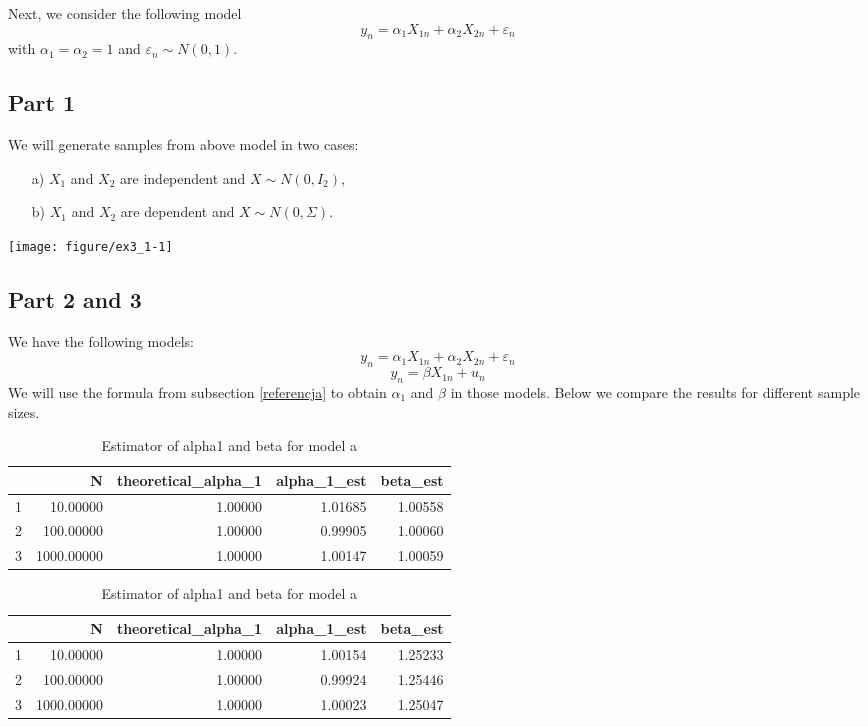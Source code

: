 \documentclass[12pt, a4paper]{article}\usepackage[]{graphicx}\usepackage[]{color}
\makeatletter
\def\maxwidth{ %
  \ifdim\Gin@nat@width>\linewidth
    \linewidth
  \else
    \Gin@nat@width
  \fi
}
\makeatother
\begin{document}
Next, we consider the following model
\[y_{n} = \alpha_{1}X_{1n}+\alpha_{2}X_{2n}+\varepsilon_{n}\]
with $\alpha_{1} = \alpha_{2} = 1$ and $\varepsilon_{n}\sim N(0,1)$.



\subsection{Part 1}
We will generate samples from above model in two cases:
\begin{enumerate}
\item[a)] $X_{1}$ and $X_{2}$ are independent and $X \sim N(0,I_{2})$,
\item[b)] $X_{1}$ and $X_{2}$ are dependent and $X \sim N(0,\Sigma)$.
\end{enumerate}


{\centering \texttt{[image: figure/ex3\_1-1]} 

}






\subsection{Part 2 and 3}
We have the following models: 
\[ y_{n} = \alpha_{1}X_{1n}+\alpha_{2}X_{2n}+\varepsilon_{n} \]
\[ y_{n} = \beta X_{1n}+u_{n} \]
We will use the formula from subsection \ref{referencja} to obtain $\alpha_{1}$ and $\beta$ in those models. 
Below we compare the results for different sample sizes.
\begin{table}[ht]
\centering
\begin{tabular}{rrrrr}
  \hline
 & N & theoretical\_alpha\_1 & alpha\_1\_est & beta\_est \\ 
  \hline
1 & 10.00000 & 1.00000 & 1.01685 & 1.00558 \\ 
  2 & 100.00000 & 1.00000 & 0.99905 & 1.00060 \\ 
  3 & 1000.00000 & 1.00000 & 1.00147 & 1.00059 \\ 
   \hline
\end{tabular}
\caption{Estimator of alpha1 and beta for model a} 
\end{table}
\begin{table}[ht]
\centering
\begin{tabular}{rrrrr}
  \hline
 & N & theoretical\_alpha\_1 & alpha\_1\_est & beta\_est \\ 
  \hline
1 & 10.00000 & 1.00000 & 1.00154 & 1.25233 \\ 
  2 & 100.00000 & 1.00000 & 0.99924 & 1.25446 \\ 
  3 & 1000.00000 & 1.00000 & 1.00023 & 1.25047 \\ 
   \hline
\end{tabular}
\caption{Estimator of alpha1 and beta for model a} 
\end{table}




\end{document}
